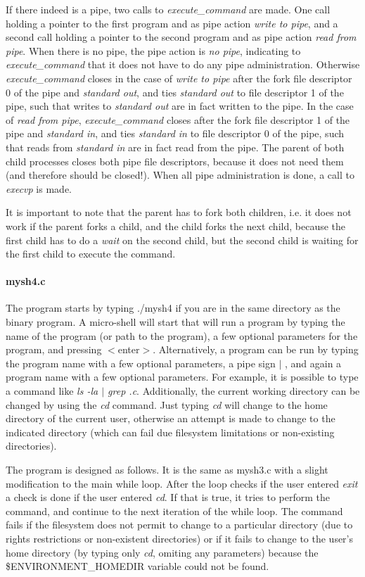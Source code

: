 \documentclass[a4paper,10pt]{article}
\begin{document}
If there indeed is a pipe, two calls to \emph{execute\_command} are made. One call holding a pointer to the first program and as pipe action \emph{write to pipe}, and a second call holding a pointer to the second program and as pipe action \emph{read from pipe}. When there is no pipe, the pipe action is \emph{no pipe}, indicating to \emph{execute\_command} that it does not have to do any pipe administration. Otherwise \emph{execute\_command} closes in the case of \emph{write to pipe} after the fork file descriptor 0 of the pipe and \emph{standard out}, and ties \emph{standard out} to file descriptor 1 of the pipe, such that writes to \emph{standard out} are in fact written to the pipe. In the case of \emph{read from pipe}, \emph{execute\_command} closes after the fork file descriptor 1 of the pipe and \emph{standard in}, and ties \emph{standard in} to file descriptor 0 of the pipe, such that reads from \emph{standard in} are in fact read from the pipe. The parent of both child processes closes both pipe file descriptors, because it does not need them (and therefore should be closed!). When all pipe administration is done, a call to \emph{execvp} is made.

It is important to note that the parent has to fork both children, i.e. it does not work if the parent forks a child, and the child forks the next child, because the first child has to do a \emph{wait} on the second child, but the second child is waiting for the first child to execute the command.

\paragraph{mysh4.c} The program starts by typing ./mysh4 if you are in the same directory as the binary program. A micro-shell will start that will run a program by typing the name of the program (or path to the program), a few optional parameters for the program, and pressing $<$enter$>$. Alternatively, a program can be run by typing the program name with a few optional parameters, a pipe sign $\mid$ , and again a program name with a few optional parameters. For example, it is possible to type a command like \emph{ls -la $\mid$ grep .c}. Additionally, the current working directory can be changed by using the \emph{cd} command. Just typing \emph{cd} will change to the home directory of the current user, otherwise an attempt is made to change to the indicated directory (which can fail due filesystem limitations or non-existing directories).

The program is designed as follows. It is the same as mysh3.c with a slight modification to the main while loop. After the loop checks if the user entered \emph{exit} a check is done if the user entered \emph{cd}. If that is true, it tries to perform the command, and continue to the next iteration of the while loop. The command fails if the filesystem does not permit to change to a particular directory (due to rights restrictions or non-existent directories) or if it fails to change to the user's home directory (by typing only \emph{cd}, omiting any parameters) because the \$ENVIRONMENT\_HOMEDIR variable could not be found.
\end{document}
